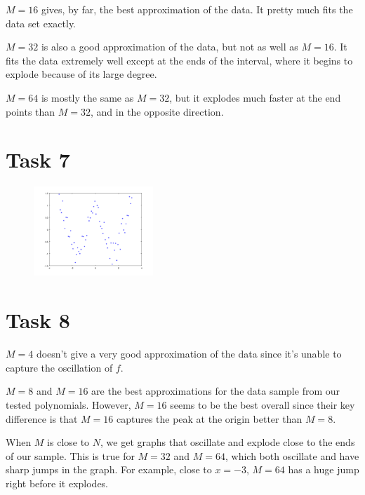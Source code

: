 \documentclass{article}
\begin{document}
$M = 16$ gives, by far, the best approximation of the data. It pretty much fits the data set exactly.

$M = 32$ is also a good approximation of the data, but not as well as $M = 16$. It fits the data extremely well except at the ends of the interval, where it begins to explode because of its large degree.

$M = 64$ is mostly the same as $M = 32$, but it explodes much faster at the end points than $M = 32$, and in the opposite direction.

\section*{Task 7}
\begin{figure}[h]
	\centering
	\includegraphics[width = 0.4\textwidth]{images/data-noise}	
\end{figure}

\pagebreak
\section*{Task 8}
$M = 4$ doesn't give a very good approximation of the data since it's unable to capture the oscillation of $f$.

$M = 8$ and $M = 16$ are the best approximations for the data sample from our tested polynomials. However, $M = 16$ seems to be the best overall since their key difference is that $M = 16$ captures the peak at the origin better than $M = 8$.
	
When $M$ is close to $N$, we get graphs that oscillate and explode close to the ends of our sample. This is true for $M = 32$ and $M = 64$, which both oscillate and have sharp jumps in the graph. For example, close to $x = -3$, $M = 64$ has a huge jump right before it explodes.
\end{document}
